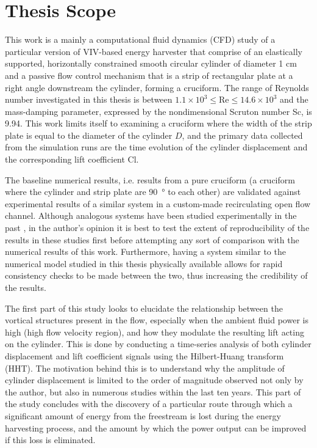 \documentclass[oneside]{utmthesis}
\begin{document}
\section{Thesis Scope}
This work is a mainly a computational fluid dynamics (CFD) study of a particular version of VIV-based energy harvester that comprise of an elastically supported, horizontally constrained smooth circular cylinder of diameter 1 cm and a passive flow control mechanism that is a strip of rectangular plate at a right angle downstream the cylinder, forming a cruciform. The range of Reynolds number investigated in this thesis is between $1.1 \times 10^{3} \leq \text{Re} \leq 14.6 \times 10^{3}$ and the mass-damping parameter, expressed by the nondimensional Scruton number Sc, is 9.94. This work limits itself to examining a cruciform where the width of the strip plate is equal to the diameter of the cylinder $D$, and the primary data collected from the simulation runs are the time evolution of the cylinder displacement and the corresponding lift coefficient Cl.

The baseline numerical results, i.e. results from a pure cruciform (a cruciform where the cylinder and strip plate are \SI{90}{\degree} to each other) are validated against experimental results of a similar system in a custom-made recirculating open flow channel. Although analogous systems have been studied experimentally in the past \citep{Koide2017,Zhao2018a}, in the author's opinion it is best to test the extent of reproducibility of the results in these studies first before attempting any sort of comparison with the numerical results of this work. Furthermore, having a system similar to the numerical model studied in this thesis physically available allows for rapid consistency checks to be made between the two, thus increasing the credibility of the results.

The first part of this study looks to elucidate the relationship between the vortical structures present in the flow, especially when the ambient fluid power is high (high flow velocity region), and how they modulate the resulting lift acting on the cylinder. This is done by conducting a time-series analysis of both cylinder displacement and lift coefficient signals using the Hilbert-Huang transform (HHT). The motivation behind this is to understand why the amplitude of cylinder displacement is limited to the order of magnitude observed not only by the author, but also in numerous studies within the last ten years. This part of the study concludes with the discovery of a particular route through which a significant amount of energy from the freestream is lost during the energy harvesting process, and the amount by which the power output can be improved if this loss is eliminated.
\end{document}
